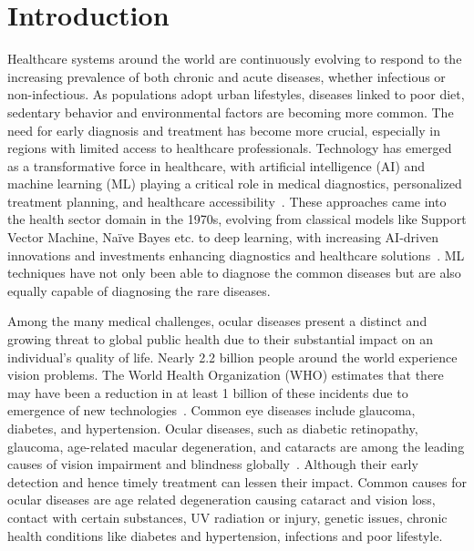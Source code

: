 \documentclass{ijclclp}
\begin{document}
\section{Introduction}
\vspace*{1em}
\justifying
Healthcare systems around the world are continuously evolving to respond to the increasing prevalence of both chronic and acute diseases, whether infectious or non-infectious. As populations adopt urban lifestyles, diseases linked to poor diet, sedentary behavior and environmental factors are becoming more common. The need for early diagnosis and treatment has become more crucial, especially in regions with limited access to healthcare professionals. Technology has emerged as a transformative force in healthcare, with artificial intelligence (AI) and machine learning (ML) playing a critical role in medical diagnostics, personalized treatment planning, and healthcare accessibility~\cite{habehh2021mlhealth}.
These approaches came into the health sector domain in the 1970s, evolving from classical models like Support Vector Machine, Naïve Bayes etc. to deep learning, with increasing AI-driven innovations and investments enhancing diagnostics and healthcare solutions~\cite{guergueb2021ocular}. ML techniques have not only been able to diagnose the common diseases but are also equally capable of diagnosing the rare diseases.

Among the many medical challenges, ocular diseases present a distinct and growing threat to global public health due to their substantial impact on an individual’s quality of life. Nearly 2.2 billion people around the world experience
vision problems. The World Health Organization (WHO)
estimates that there may have been a reduction in at least
1 billion of these incidents due to emergence of new technologies~\cite{whovision2019}. Common eye diseases include glaucoma, diabetes, and
hypertension. Ocular diseases, such as diabetic retinopathy,
glaucoma, age-related macular degeneration, and cataracts 
are among the leading causes of vision impairment and
blindness globally~\cite{rahmani1996baltimore}. Although their early
detection and hence timely treatment can
lessen their impact. Common causes for ocular
diseases are age related degeneration causing cataract and vision loss, contact with certain substances, UV radiation or
injury, genetic issues, chronic health conditions like diabetes
and hypertension, infections and poor lifestyle. 
\end{document}
